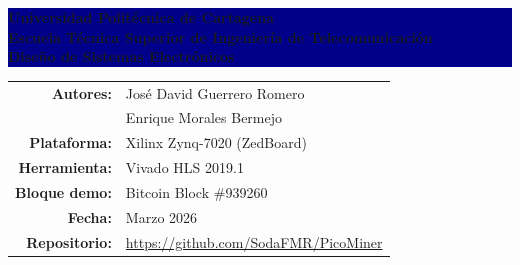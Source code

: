 \documentclass[12pt,a4paper]{article}
\begin{document}
\begin{titlepage}
    \begin{center}
        \vspace*{1cm}

        \noindent\colorbox{darkblue}{%
            \parbox{\dimexpr\textwidth-2\fboxsep}{%
                \centering\color{white}\large\bfseries
                \vspace{0.4cm}
                Universidad Polit\'ecnica de Cartagena\\[0.2cm]
                \normalsize Escuela T\'ecnica Superior de Ingenier\'ia de Telecomunicaci\'on\\[0.2cm]
                \normalsize Dise\~no de Sistemas Electr\'onicos
                \vspace{0.4cm}
            }%
        }

        \vspace{2cm}


        \vspace{2cm}

        {\large\color{darkblue}
        \begin{tabular}{rl}
            \textbf{Autores:} & Jos\'e David Guerrero Romero \\
                              & Enrique Morales Bermejo \\[0.5cm]
            \textbf{Plataforma:} & Xilinx Zynq-7020 (ZedBoard) \\[0.3cm]
            \textbf{Herramienta:} & Vivado HLS 2019.1 \\[0.3cm]
            \textbf{Bloque demo:} & Bitcoin Block \#939260 \\[0.3cm]
            \textbf{Fecha:} & Marzo 2026 \\[0.3cm]
            \textbf{Repositorio:} & \url{https://github.com/SodaFMR/PicoMiner}
        \end{tabular}
        }


\end{center}
\end{titlepage}
\end{document}
